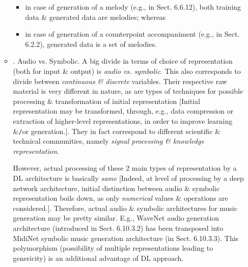 \documentclass{article}
\begin{document}
\begin{itemize}
\begin{itemize}
		\begin{itemize}
			\item in case of generation of a melody (e.g., in Sect. 6.6.12), both training data \& generated data are melodies; whereas
			\item in case of generation of a counterpoint accompaniment (e.g., in Sect. 6.2.2), generated data is a set of melodies.
		\end{itemize}
		\item {. Audio vs. Symbolic.} A big divide in terms of choice of representation (both for input \& output) is {\it audio vs. symbolic}. This also corresponds to divide between {\it continuous \& discrete} variables. Their respective raw material is very different in nature, as are types of techniques for possible processing \& transformation of initial representation [Initial representation may be transformed, through, e.g., data compression or extraction of higher-level representations, in order to improve learning \&{\tt/}or generation.]. They in fact correspond to different scientific \& technical communities, namely {\it signal processing \& knowledge representation}.
		
		However, actual processing of these 2 main types of representation by a DL architecture is basically {\it same} [Indeed, at level of processing by a deep network architecture, initial distinction between audio \& symbolic representation boils down, as only {\it numerical} values \& operations are considered.]. Therefore, actual audio \& symbolic architectures for music generation may be pretty similar. E.g., WaveNet audio generation architecture (introduced in Sect. 6.10.3.2) has been transposed into MidiNet symbolic music generation architecture (in Sect. 6.10.3.3). This polymorphism (possibility of multiple representations leading to genericity) is an additional advantage of DL approach.
		

\end{itemize}
\end{itemize}
\end{document}

